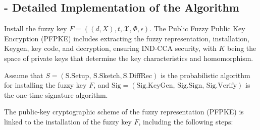 \documentclass[graybox]{svmult}
\begin{document}
\subsection*{- Detailed Implementation of the Algorithm}
Install the fuzzy key \( F = ((d, X), t, \mathcal{X}, \varPhi, \epsilon) \). The Public Fuzzy Public Key Encryption (PFPKE) includes extracting the fuzzy representation, installation, Keygen, key code, and decryption, ensuring IND-CCA security, with \( K \) being the space of private keys that determine the key characteristics and homomorphism.

Assume that \( S = (\text{S.Setup},\, \text{S.Sketch}, \text{S.DiffRec}) \) is the probabilistic algorithm for installing the fuzzy key \( F \), and \( \text{Sig} = (\text{Sig.KeyGen},\, \text{Sig.Sign},\, \text{Sig.Verify}) \) is the one-time signature algorithm.

The public-key cryptographic scheme of the fuzzy representation (PFPKE) is linked to the installation of the fuzzy key \( F \), including the following steps:
\end{document}
